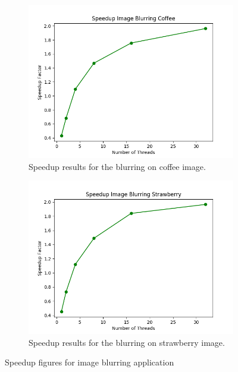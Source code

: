 \documentclass{article}
\begin{document}
\begin{figure}[!htb]
    \centering
    \begin{subfigure}{.45\textwidth}
        \centering
        \includegraphics[width=1\linewidth]{./img/speedup_part_1_A.png}
        \caption{Speedup results for the blurring on coffee image.}
    \end{subfigure} 
    \begin{subfigure}{.45\textwidth}
        \centering
        \includegraphics[width=1\linewidth]{./img/speedup_part_1_A_strawberry.png}
        \caption{Speedup results for the blurring on strawberry image.}
    \end{subfigure}
    \caption{Speedup figures for image blurring application}
\end{figure}   
\end{document}
